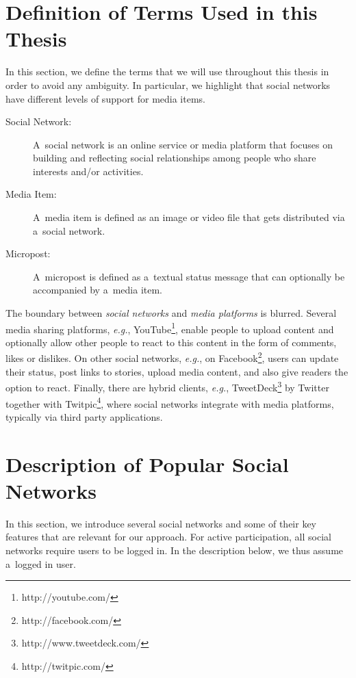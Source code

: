 \section{Definition of Terms Used in this Thesis}
\label{sec:definition}

In this section, we define the terms
that we will use throughout this thesis
in order to avoid any ambiguity.
In particular, we highlight that social networks have
different levels of support for media items.

\begin{description}
  \item[Social Network:]
       A~social network is an online service or media platform
       that focuses on building and reflecting
       social relationships among people
       who share interests and/or activities.
  \item[Media Item:]
       A~media item is defined as an image or video
       file that gets distributed via a~social network.
  \item[Micropost:]
       A~micropost is defined as a~textual status message
       that can optionally be accompanied by a~media item.
\end{description}

The boundary between \emph{social networks} and
\emph{media platforms} is blurred.
Several media sharing platforms, \emph{e.g.},
YouTube\footnote{http://youtube.com/},
enable people to upload content
and optionally allow other people to react
to this content in the form of comments, likes or dislikes.
On other social networks, \emph{e.g.},
on Facebook\footnote{http://facebook.com/},
users can update their status, post links to stories,
upload media content, and also give readers the option to react.
Finally, there are hybrid clients, \emph{e.g.},
TweetDeck\footnote{http://www.tweetdeck.com/}
by Twitter together with
Twitpic\footnote{http://twitpic.com/},
where social networks integrate with media platforms,
typically via third party applications.

\section{Description of Popular Social Networks}
\label{sec:description-of-popular-social-networks}

In this section, we introduce several social networks
and some of their key features
that are relevant for our approach.
For active participation,
all social networks require users to be logged in.
In the description below, we thus assume a~logged in user.

